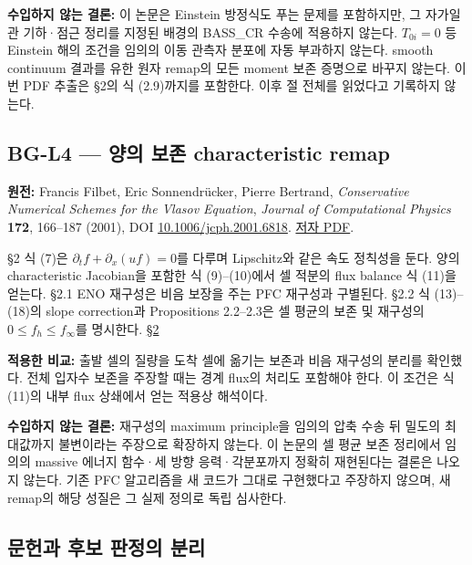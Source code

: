 \textbf{수입하지 않는 결론:} 이 논문은 Einstein 방정식도 푸는 문제를 포함하지만, 그 자가일관 기하·점근 정리를 지정된 배경의 BASS\_CR 수송에 적용하지 않는다. \(T_{0i}=0\) 등 Einstein 해의 조건을 임의의 이동 관측자 분포에 자동 부과하지 않는다. smooth continuum 결과를 유한 원자 remap의 모든 moment 보존 증명으로 바꾸지 않는다. 이번 PDF 추출은 §2의 식 (2.9)까지를 포함한다. 이후 절 전체를 읽었다고 기록하지 않는다.

\hypertarget{bg-l4-uxc591uxc758-uxbcf4uxc874-characteristic-remap}{%
\subsection{BG-L4 --- 양의 보존 characteristic remap}\label{bg-l4-uxc591uxc758-uxbcf4uxc874-characteristic-remap}}

\textbf{원전:} Francis Filbet, Eric Sonnendrücker, Pierre Bertrand, \emph{Conservative Numerical Schemes for the Vlasov Equation}, \emph{Journal of Computational Physics} \textbf{172}, 166--187 (2001), DOI \href{https://doi.org/10.1006/jcph.2001.6818}{10.1006/jcph.2001.6818}. \href{https://www.math.univ-toulouse.fr/~ffilbet/Papers/paper03.pdf}{저자 PDF}.

§2 식 (7)은 \(\partial_t f+\partial_x(uf)=0\)를 다루며 Lipschitz와 같은 속도 정칙성을 둔다. 양의 characteristic Jacobian을 포함한 식 (9)--(10)에서 셀 적분의 flux balance 식 (11)을 얻는다. §2.1 ENO 재구성은 비음 보장을 주는 PFC 재구성과 구별된다. §2.2 식 (13)--(18)의 slope correction과 Propositions 2.2--2.3은 셀 평균의 보존 및 재구성의 \(0\le f_h\le f_\infty\)를 명시한다. \href{https://www.math.univ-toulouse.fr/~ffilbet/Papers/paper03.pdf}{§2}

\textbf{적용한 비교:} 출발 셀의 질량을 도착 셀에 옮기는 보존과 비음 재구성의 분리를 확인했다. 전체 입자수 보존을 주장할 때는 경계 flux의 처리도 포함해야 한다. 이 조건은 식 (11)의 내부 flux 상쇄에서 얻는 적용상 해석이다.

\textbf{수입하지 않는 결론:} 재구성의 maximum principle을 임의의 압축 수송 뒤 밀도의 최대값까지 불변이라는 주장으로 확장하지 않는다. 이 논문의 셀 평균 보존 정리에서 임의의 massive 에너지 함수·세 방향 응력·각분포까지 정확히 재현된다는 결론은 나오지 않는다. 기존 PFC 알고리즘을 새 코드가 그대로 구현했다고 주장하지 않으며, 새 remap의 해당 성질은 그 실제 정의로 독립 심사한다.

\hypertarget{uxbb38uxd5ccuxacfc-uxd6c4uxbcf4-uxd310uxc815uxc758-uxbd84uxb9ac}{%
\subsection{문헌과 후보 판정의 분리}\label{uxbb38uxd5ccuxacfc-uxd6c4uxbcf4-uxd310uxc815uxc758-uxbd84uxb9ac}}

